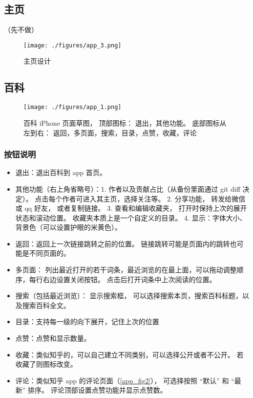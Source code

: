 
\begin{issues}
\issueDraft
\end{issues}

\subsection{主页}

（先不做）
\begin{figure}[ht]
\centering
\texttt{[image: ./figures/app\_3.png]}
\caption{主页设计} \label{app_fig3}
\end{figure}

\subsection{百科}
\begin{figure}[ht]
\centering
\texttt{[image: ./figures/app\_1.png]}
\caption{百科 iPhone 页面草图， 顶部图标： 退出，其他功能。 底部图标从左到右： 返回，多页面，搜索，目录，点赞，收藏，评论}\label{app_fig1}
\end{figure}

\subsubsection{按钮说明}
\begin{itemize}
\item 退出：退出百科到 app 首页。
\item 其他功能（右上角省略号）：1. 作者以及贡献占比（从备份里面通过 git diff 决定）。 点击每个作者可进入其主页，选择关注等。 2. 分享功能， 转发给微信或 qq 好友， 或者复制链接。 3. 查看和编辑收藏夹， 打开时保持上次的展开状态和滚动位置。 收藏夹本质上是一个自定义的目录。 4. 显示：字体大小、 背景色（可以设置护眼的米黄色）。
\item 返回：返回上一次链接跳转之前的位置。 链接跳转可能是页面内的跳转也可能是不同页面的。
\item 多页面： 列出最近打开的若干词条，最近浏览的在最上面，可以拖动调整顺序，每行右边设置关闭按钮。 点击后打开词条中上次阅读的位置。
\item 搜索（包括最近浏览）： 显示搜索框， 可以选择搜索本页，搜索百科标题，以及搜索百科全文。
\item 目录：支持每一级的向下展开，记住上次的位置
\item 点赞：点赞和显示数量。
\item 收藏：类似知乎的，可以自己建立不同类别，可以选择公开或者不公开。 若收藏了则图标改变。
\item 评论：类似知乎 app 的评论页面（\autoref{app_fig2}）， 可选择按照 “默认” 和 “最新” 排序。 评论顶部设置点赞功能并显示点赞数。
\end{itemize}

